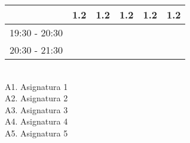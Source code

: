 \documentclass[10pt,spanish, landscape, twocolumn]{article}
\begin{document}
\begin{flushright}
\begin{tabular}{|c|c|c|c|c|c|}
& \cellcolor{grisclaro} {\footnotesize 1.2}& \cellcolor{grisclaro} {\footnotesize 1.2}& \cellcolor{grisclaro} {\footnotesize 1.2}& \cellcolor{grisclaro} {\footnotesize 1.2}& \cellcolor{grisclaro} {\footnotesize 1.2} \\
\hline
\multirow{2}{*}{19:30 - 20:30} & & & & & \\
& & & & & \\
\hline
\multirow{2}{*}{20:30 - 21:30} & & & & & \\
& & & & & \\
\hline
\end{tabular}
\\[0.25cm]

A1. Asignatura 1 \\[0.5cm]

A2. Asignatura 2 \\[0.5cm]

A3. Asignatura 3 \\[0.5cm]

A4. Asignatura 4 \\[0.5cm]

A5. Asignatura 5 \\[0.5cm]

\end{flushright}
\end{document}
